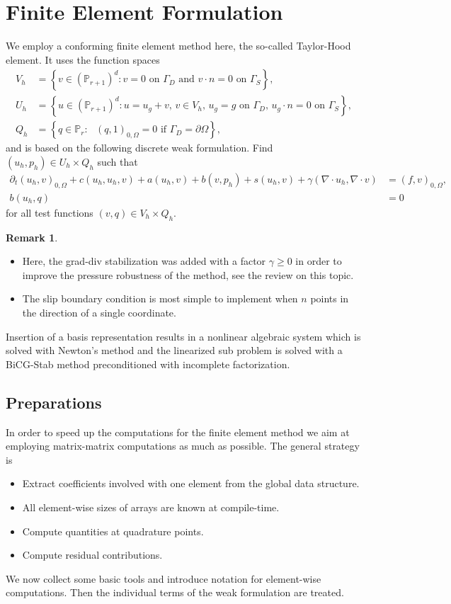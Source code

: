 \documentclass[a4paper,12pt]{article}
\theoremstyle{definition}
\newtheorem{Rem}[Def]{Remark}
\begin{document}
\section{Finite Element Formulation}

We employ a conforming finite element method here, the so-called Taylor-Hood element. It uses the function spaces
\begin{align}
V_h &= \left\{ v\in (\mathbb{P}_{r+1})^d : \text{$v=0$ on $\Gamma_D$ and $v\cdot n=0$ on $\Gamma_S$} \right\},\\
U_h &= \left\{ u\in (\mathbb{P}_{r+1})^d : \text{$u=u_g+v$, $v\in V_h$, $u_g=g$ on $\Gamma_D$, $u_g\cdot n=0$ on $\Gamma_S$} \right\},\\
Q_h &= \left\{ q\in \mathbb{P}_r : \text{ $(q,1)_{0,\Omega}=0$ if $\Gamma_D=\partial\Omega$} \right\},
\end{align}
and is based on the following discrete weak formulation. Find $(u_h,p_h)\in U_h\times Q_h$ such that
{\small\begin{align}
\partial_t (u_h,v)_{0,\Omega} + c(u_h,u_h,v) + a(u_h,v) + b(v,p_h) + s(u_h,v) + \gamma (\nabla\cdot u_h, \nabla\cdot v) &= (f,v)_{0,\Omega}, \\
b(u_h,q) &= 0
\end{align}}
for all test functions $(v,q) \in V_h\times Q_h$.
 
\begin{Rem}
\begin{itemize}
\item Here, the grad-div stabilization was added with a factor $\gamma\geq 0$ in order to improve the pressure
robustness of the method, see the review \cite{John_etal_2017} on this topic.
\item The slip boundary condition is most simple to implement when $n$ points in the direction of a single coordinate.
\end{itemize}
\end{Rem}
Insertion of a basis representation results in a nonlinear algebraic
system which is solved with Newton's method and the linearized sub
problem is solved with a BiCG-Stab method preconditioned with
incomplete factorization.

\subsection{Preparations}

In order to speed up the computations for the finite element method we
aim at employing matrix-matrix computations as much as possible. The
general strategy is
\begin{itemize}
  \item Extract coefficients involved with one element from the global
    data structure.
  \item All element-wise sizes of arrays are known at compile-time.
  \item Compute quantities at quadrature points.
  \item Compute residual contributions.
\end{itemize}
We now collect some basic tools and introduce notation for
element-wise computations. Then the individual terms of the weak
formulation are treated.
\end{document}
